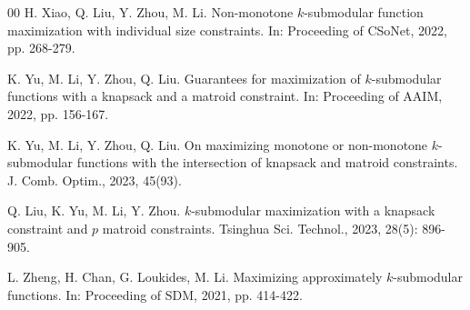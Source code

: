 \documentclass[preprint,12pt]{elsarticle}
\begin{document}
\begin{thebibliography}{00}
H. Xiao, Q. Liu, Y. Zhou, M. Li.
Non-monotone $k$-submodular function maximization with individual size constraints.
In: Proceeding of CSoNet, 2022, pp. 268-279.

K. Yu, M. Li, Y. Zhou, Q. Liu.
Guarantees for maximization of $k$-submodular functions with a knapsack and a matroid constraint.
In: Proceeding of AAIM, 2022, pp. 156-167.

K. Yu, M. Li, Y. Zhou, Q. Liu.
On maximizing monotone or non-monotone $k$-submodular functions with the intersection of knapsack and matroid constraints.
J. Comb. Optim., 2023, 45(93).

Q. Liu, K. Yu, M. Li, Y. Zhou.
$k$-submodular maximization with a knapsack constraint and $p$ matroid constraints.
Tsinghua Sci. Technol., 2023, 28(5): 896-905.

L. Zheng, H. Chan, G. Loukides, M. Li.
Maximizing approximately $k$-submodular functions.
In: Proceeding of SDM, 2021, pp. 414-422.



\end{thebibliography}
\end{document}
